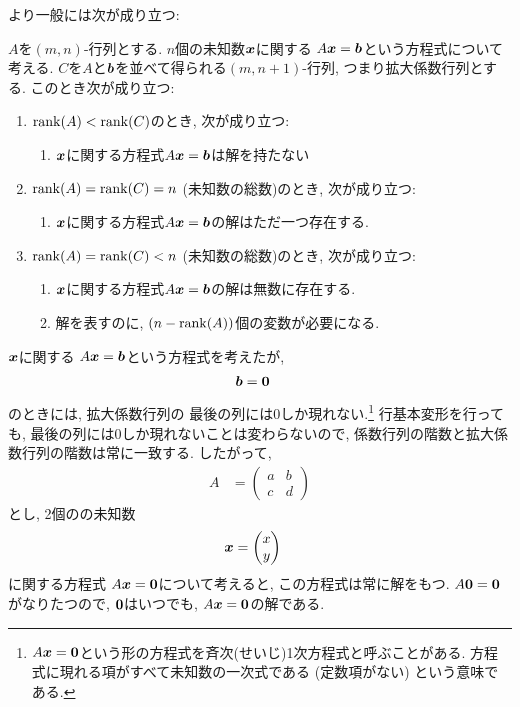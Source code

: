 より一般には次が成り立つ:
\begin{theorem}
  \label{thm:solution:syslineq}
  $A$を$(m,n)$-行列とする.
  $n$個の未知数$\boldsymbol{x}$に関する
  $A\boldsymbol{x}=\boldsymbol{b}$という方程式について考える.
  $C$を$A$と$\boldsymbol{b}$を並べて得られる$(m,n+1)$-行列,
  つまり拡大係数行列とする.
  このとき次が成り立つ:
  \begin{enumerate}
  \item $\operatorname{rank}(A)<\operatorname{rank}(C)$のとき, 次が成り立つ:
    \begin{enumerate}
    \item $\boldsymbol{x}$に関する方程式$A\boldsymbol{x}=\boldsymbol{b}$は解を持たない
    \end{enumerate}
  \item $\operatorname{rank}(A)=\operatorname{rank}(C)=n$ (未知数の総数)のとき, 次が成り立つ:
    \begin{enumerate}
    \item $\boldsymbol{x}$に関する方程式$A\boldsymbol{x}=\boldsymbol{b}$の解はただ一つ存在する.
    \end{enumerate}
  \item $\operatorname{rank}(A)=\operatorname{rank}(C)<n$ (未知数の総数)のとき, 次が成り立つ:
    \begin{enumerate}
    \item $\boldsymbol{x}$に関する方程式$A\boldsymbol{x}=\boldsymbol{b}$の解は無数に存在する.
    \item 解を表すのに, $(n-\operatorname{rank}(A))$個の変数が必要になる.
    \end{enumerate}
  \end{enumerate}
\end{theorem}

$\boldsymbol{x}$に関する
$A\boldsymbol{x}=\boldsymbol{b}$という方程式を考えたが,
\begin{align*}
  \boldsymbol{b}&=\boldsymbol{0}
\end{align*}
のときには,
拡大係数行列の
最後の列には$0$しか現れない.\footnote{$A\boldsymbol{x}=\boldsymbol{0}$という形の方程式を斉次(せいじ)1次方程式と呼ぶことがある. 方程式に現れる項がすべて未知数の一次式である (定数項がない) という意味である.}
行基本変形を行っても, 
最後の列には$0$しか現れないことは変わらないので,
係数行列の階数と拡大係数行列の階数は常に一致する.
したがって, 
\begin{align*}
  A&=
  \begin{pmatrix}
    a&b\\
    c&d
  \end{pmatrix}
\end{align*}
とし, 2個のの未知数
\begin{align*}
  \boldsymbol{x}&=
  \begin{pmatrix}
    x\\y
  \end{pmatrix}
\end{align*}
に関する方程式 $A\boldsymbol{x}=\boldsymbol{0}$について考えると,
この方程式は常に解をもつ.
$A\boldsymbol{0}=\boldsymbol{0}$がなりたつので, $\boldsymbol{0}$はいつでも,
$A\boldsymbol{x}=\boldsymbol{0}$の解である.

